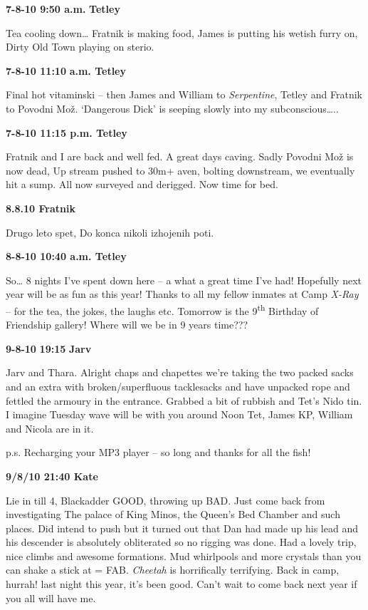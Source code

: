 \textbf{7-8-10 9:50 a.m.} \textbf{Tetley}

Tea cooling down\ldots{} Fratnik is making food, James is putting his
wetish furry on, Dirty Old Town playing on sterio.

\textbf{7-8-10 11:10} \textbf{a.m. Tetley}

Final hot vitaminski -- then James and William to \emph{Serpentine},
Tetley and Fratnik to Povodni Mož. `Dangerous Dick' is seeping slowly
into my subconscious\ldots{}..

\textbf{7-8-10 11:15 p.m. Tetley}

Fratnik and I are back and well fed. A great days caving. Sadly Povodni
Mož is now dead, Up stream pushed to 30m+ aven, bolting downstream, we
eventually hit a sump. All now surveyed and derigged. Now time for bed.

\textbf{8.8.10 Fratnik}

Drugo leto spet, Do konca nikoli izhojenih poti.

\textbf{8-8-10 10:40 a.m. Tetley}

So\ldots{} 8 nights I've spent down here -- a what a great time I've
had! Hopefully next year will be as fun as this year! Thanks to all my
fellow inmates at Camp \emph{X-Ray} -- for the tea, the jokes, the
laughs etc. Tomorrow is the 9\textsuperscript{th} Birthday of Friendship
gallery! Where will we be in 9 years time???

\textbf{9-8-10} \textbf{19:15} \textbf{Jarv}

Jarv and Thara. Alright chaps and chapettes we're taking the two packed
sacks and an extra with broken/superfluous tacklesacks and have unpacked
rope and fettled the armoury in the entrance. Grabbed a bit of rubbish
and Tet's Nido tin. I imagine Tuesday wave will be with you around Noon
Tet, James KP, William and Nicola are in it.

p.s. Recharging your MP3 player -- so long and thanks for all the fish!

\textbf{9/8/10 21:40 Kate}

Lie in till 4, Blackadder GOOD, throwing up BAD. Just come back from
investigating The palace of King Minos, the Queen's Bed Chamber and such
places. Did intend to push but it turned out that Dan had made up his
lead and his descender is absolutely obliterated so no rigging was done.
Had a lovely trip, nice climbs and awesome formations. Mud whirlpools
and more crystals than you can shake a stick at = FAB. \emph{Cheetah} is
horrifically terrifying. Back in camp, hurrah! last night this year,
it's been good. Can't wait to come back next year if you all will have
me.

